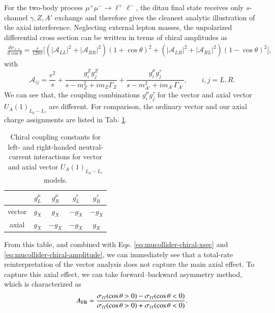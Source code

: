 \documentclass[onecolumn, aps, nofootinbib, prd, preprint, floats, floatfix, amsmath, amssymb, superscriptaddress, preprintnumbers]{revtex4-2}
\begin{document}
For the two-body process $\mu^+\mu^-\to\ell^+\ell^-$, the ditau final state receives only $s$-channel $\gamma,Z,A'$ exchange and therefore gives the cleanest analytic illustration of the axial interference. 
Neglecting external lepton masses, the unpolarized differential cross section can be written in terms of chiral amplitudes as
\begin{align}
\frac{d\sigma_{\ell\ell}}{d\cos\theta}=
\frac{s}{128\pi}
\bigg[ \left(|\mathcal A_{LL}|^2+|\mathcal A_{RR}|^2\right)(1+\cos\theta)^2 + \left(|\mathcal A_{LR}|^2+|\mathcal A_{RL}|^2\right)(1-\cos\theta)^2 \bigg],
\label{eq:mucollider-chiral-xsec}
\end{align}
with
\begin{equation}
\mathcal A_{ij}
=\frac{e^2}{s}+\frac{g_i^Z g_j^Z}{s-m_Z^2+i m_Z\Gamma_Z}+\frac{g_i^\mu g_j^\tau}{s-m_{A'}^2+i m_{A'}\Gamma_{A'}},
\qquad i,j=L,R .
\label{eq:mucollider-chiral-amplitude}
\end{equation}
We can see that, the coupling combinations $g_i^\mu g_j^\tau$ for the vector and axial vector $U_A(1)_{L_\mu-L_\tau}$ are different. For comparison, the ordinary vector and our axial charge assignments are listed in Tab. \ref{tab:vector-axial-charges}. 
\begin{table}[htbp]
    \centering
    \begin{tabular}{c|cccc}
    \hline
     & $g_L^\mu$ & $g_R^\mu$ & $g_L^\tau$ & $g_R^\tau$ \\
    \hline
    vector & $g_X$ & $g_X$ & $-g_X$ & $-g_X$ \\
    axial & $g_X$ & $-g_X$ & $-g_X$ & $g_X$ \\
    \hline
    \end{tabular}
    \caption{Chiral coupling constants for left- and right-handed neutral-current interactions for vector and axial vector $U_A(1)_{L_\mu-L_\tau}$ models.}
    \label{tab:vector-axial-charges}
\end{table}
From this table, and combined with Eqs. \eqref{eq:mucollider-chiral-xsec} and \eqref{eq:mucollider-chiral-amplitude}, we can immediately see that a total-rate reinterpretation of the vector analysis does not capture the main axial effect. To capture this axial effect, we can take forward–backward asymmetry method, which is characterized as
\begin{equation}
A_{\rm FB}=
\frac{\sigma_{\ell\ell}(\cos\theta>0)-\sigma_{\ell\ell}(\cos\theta<0)}
{\sigma_{\ell\ell}(\cos\theta>0)+\sigma_{\ell\ell}(\cos\theta<0)}.
\label{eq:mucollider-afb}
\end{equation}
\end{document}
